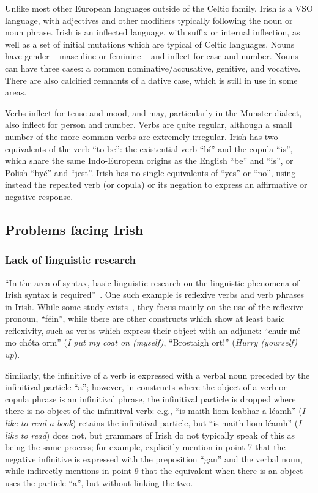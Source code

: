 Unlike most other European languages outside of the Celtic family, Irish is a VSO language,
with adjectives and other modifiers typically following the noun or noun phrase.
Irish is an inflected language, with suffix or internal inflection, as well as a set of initial
mutations which are typical of Celtic languages. Nouns have gender -- masculine or feminine --
and inflect for case and number. Nouns can have three cases: a common nominative/accusative,
genitive, and vocative. There are also calcified remnants of a dative case, which is still
in use in some areas.

Verbs inflect for tense and mood, and may, particularly in the Munster dialect, also inflect for person
and number. Verbs are quite
regular, although a small number of the more common verbs are extremely irregular. Irish has
two equivalents of the verb ``to be'': the existential verb ``b\'i'' and the copula ``is'', 
which share the same Indo-European origins as the English ``be'' and ``is'', or Polish 
``by\'c'' and ``jest''. Irish has no single equivalents of ``yes'' or ``no'', using instead
the repeated verb (or copula) or its negation to express an affirmative or negative response.

\subsection{Problems facing Irish}

\subsubsection{Lack of linguistic research}
\label{sssect:lingresearch}

``In the area of syntax, basic linguistic research on the linguistic phenomena of Irish syntax is 
required''~\citep[p. 73]{LWP-Irish}. One such example is reflexive verbs and verb phrases in Irish.
While some study exists~\citep[e.g.,][]{nolan2004rrg,nolan2000reflexive}, they focus mainly on the use of the
reflexive pronoun, ``f\'ein'', while there are other constructs which show at least basic reflexivity, such
as verbs which express their object with an adjunct: ``chuir m\'e mo ch\'ota orm'' (\textit{I put my coat on 
(myself)}, ``Brostaigh ort!'' (\textit{Hurry (yourself) up}).

Similarly, the infinitive of a verb is
expressed with a verbal noun preceded by the infinitival particle ``a''; however, in constructs where
the object of a verb or copula phrase is an infinitival phrase, the infinitival particle is dropped
where there is no object of the infinitival verb: e.g., ``is maith liom leabhar a l\'eamh'' 
(\textit{I like to read a book}) retains the infinitival particle, but 
``is maith liom l\'eamh'' (\textit{I like to read}) does not, but grammars of Irish do not typically
speak of this as being the same process; for example, \citet[p. 128]{grammar1980cb} explicitly mention
in point 7 that the negative infinitive is expressed with the preposition ``gan'' and the verbal noun,
while indirectly mentions in point 9 that the equivalent when there is an object uses the particle ``a'',
but without linking the two.

